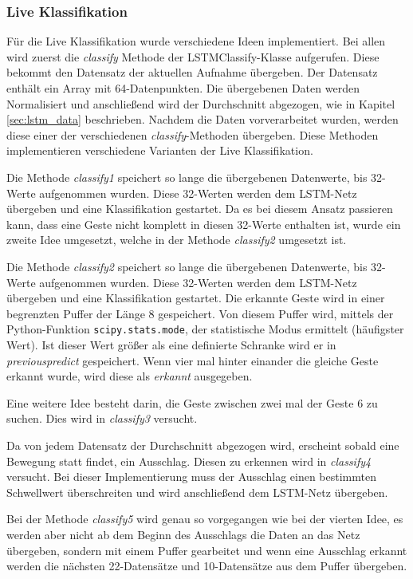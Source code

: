 \subsubsection*{Live Klassifikation} Für die Live Klassifikation wurde
verschiedene Ideen implementiert.
Bei allen wird zuerst die \textit{classify} Methode der LSTMClassify-Klasse aufgerufen.
Diese bekommt den Datensatz der aktuellen Aufnahme übergeben.
Der Datensatz enthält ein Array mit 64-Datenpunkten. Die übergebenen Daten
werden Normalisiert und anschließend wird der Durchschnitt abgezogen, wie in
Kapitel \autoref{sec:lstm_data} beschrieben. Nachdem die Daten vorverarbeitet
wurden, werden diese einer der verschiedenen \textit{classify}-Methoden
übergeben. Diese Methoden implementieren verschiedene Varianten der Live
Klassifikation.

Die Methode \textit{classify1} speichert so lange die übergebenen Datenwerte, 
bis 32-Werte aufgenommen wurden. Diese 32-Werten werden dem \ac{LSTM}-Netz 
übergeben und eine Klassifikation gestartet. Da es bei diesem Ansatz passieren kann, 
dass eine Geste nicht komplett in diesen 32-Werte enthalten ist, wurde ein zweite 
Idee umgesetzt, welche in der Methode \textit{classify2} umgesetzt ist.

Die Methode \textit{classify2} speichert so lange die übergebenen Datenwerte,
bis 32-Werte aufgenommen wurden. Diese 32-Werten werden dem \ac{LSTM}-Netz
übergeben und eine Klassifikation gestartet. Die erkannte Geste wird in einer
begrenzten Puffer der Länge 8 gespeichert. Von diesem Puffer wird, mittels der
Python-Funktion \texttt{scipy.stats.mode}, der statistische Modus ermittelt
(häufigster Wert). Ist dieser Wert größer als eine definierte Schranke wird er
in \textit{previouspredict} gespeichert. Wenn vier mal hinter einander die
gleiche Geste erkannt wurde, wird diese als \textit{erkannt} ausgegeben.

Eine weitere Idee besteht darin, die Geste zwischen zwei mal der Geste 6 zu 
suchen. Dies wird in \textit{classify3} versucht.

Da von jedem Datensatz der Durchschnitt abgezogen wird, erscheint sobald eine 
Bewegung statt findet, ein Ausschlag. Diesen zu erkennen wird in \textit{classify4} 
versucht. Bei dieser Implementierung muss der Ausschlag einen bestimmten Schwellwert 
überschreiten und wird anschließend dem LSTM-Netz übergeben.

Bei der Methode \textit{classify5} wird genau so vorgegangen wie bei der vierten 
Idee, es werden aber nicht ab dem Beginn des Ausschlags die Daten an das 
Netz übergeben, sondern mit einem Puffer gearbeitet und wenn eine Ausschlag erkannt 
werden die nächsten 22-Datensätze und 10-Datensätze aus dem Puffer übergeben.

